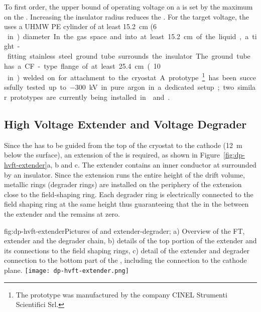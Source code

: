 To first order, the upper bound of operating voltage on a \fdth is set by the maximum \efield on the \fdth.  Increasing the insulator radius reduces the \efield.  For the target voltage, the \fdth uses a UHMW PE cylinder of at least \SI{15.2}{\cm} (\SI{6}\,in) diameter.  In the gas space and into at least \SI{15.2}{\cm} of the liquid, a tight-fitting stainless steel ground tube surrounds the insulator.  The ground tube has a CF-type 
flange of at least \SI{25.4}{\cm} (\SI{10}\,in) welded on for attachment to the cryostat.  A prototype\footnote{The prototype was manufactured by the company CINEL\texttrademark{} Strumenti Scientifici Srl.}  has been successfully tested up to \SI{-300}{\kV} in pure argon in a dedicated setup; two similar prototypes are currently being installed in  and .


\subsection{High Voltage Extender and Voltage Degrader}

Since the  has to be guided from the top of the cryostat to the cathode (\SI{12}{\m} below the  surface), an extension of the  \fdth is required, as shown in Figure~\ref{fig:dp-hvft-extender}a, b and c. The extender contains an inner conductor at \dptargetdriftvoltneg surrounded by an insulator. Since the extension runs the entire height of the drift volume, metallic rings (degrader rings) are installed on the periphery of the extension close to the field-shaping ring. Each degrader ring is electrically connected to the field shaping ring at the same height thus guaranteeing that the \efield in the \lar between the extender and the  remains at zero.


\begin{dunefigure}{fig:dp-hvft-extender}{Pictures of  \fdth and  extender-degrader; a) Overview of the  FT,  extender and the degrader chain, b) details of the top portion of the  extender and its connections to the field shaping rings, c) detail of the  extender and degrader connection to the bottom part of the , including the connection to the cathode plane.}
\texttt{[image: dp-hvft-extender.png]}
\end{dunefigure}

